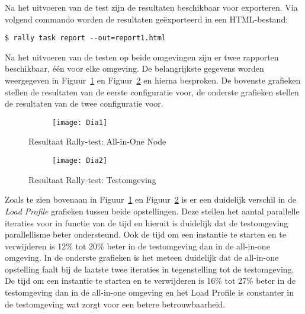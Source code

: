 Na het uitvoeren van de test zijn de resultaten beschikbaar voor exporteren. Via volgend commando worden de resultaten geëxporteerd in een HTML-bestand:

\begin{code}
\begin{verbatim}
$ rally task report --out=report1.html
\end{verbatim}
\end{code}

Na het uitvoeren van de testen op beide omgevingen zijn er twee rapporten beschikbaar, één voor elke omgeving. De belangrijkste gegevens worden weergegeven in Figuur~\ref{fig:rally-test1} en Figuur~\ref{fig:rally-test2} en hierna besproken. De bovenste grafieken stellen de resultaten van de eerste configuratie voor, de onderste grafieken stellen de resultaten van de twee configuratie voor.

\begin{figure}
  \centering
  \captionsetup{justification=centering}
  \begin{subfigure}{\textwidth}
    \centering
    \centerline{
      \texttt{[image: Dia1]}
    }
  \end{subfigure}
  \caption{Resultaat Rally-test: All-in-One Node}
  \label{fig:rally-test1}
\end{figure}

\begin{figure}
  \centering
  \captionsetup{justification=centering}
  \begin{subfigure}{\textwidth}
    \centering
    \centerline{
      \texttt{[image: Dia2]}
    }
  \end{subfigure}
  \caption{Resultaat Rally-test: Testomgeving}
  \label{fig:rally-test2}
\end{figure}

Zoals te zien bovenaan in Figuur~\ref{fig:rally-test1} en Figuur~\ref{fig:rally-test2} is er een duidelijk verschil in de \textit{Load Profile} grafieken tussen beide opstellingen. Deze stellen het aantal parallelle iteraties voor in functie van de tijd en hieruit is duidelijk dat de testomgeving parallellisme beter ondersteund. Ook de tijd om een instantie te starten en te verwijderen is 12\% tot 20\% beter in de testomgeving dan in de all-in-one omgeving.
In de onderste grafieken is het meteen duidelijk dat de all-in-one opstelling faalt bij de laatste twee iteraties in tegenstelling tot de testomgeving. De tijd om een instantie te starten en te verwijderen is 16\% tot 27\% beter in de testomgeving dan in de all-in-one omgeving en het Load Profile is constanter in de testomgeving wat zorgt voor een betere betrouwbaarheid.


